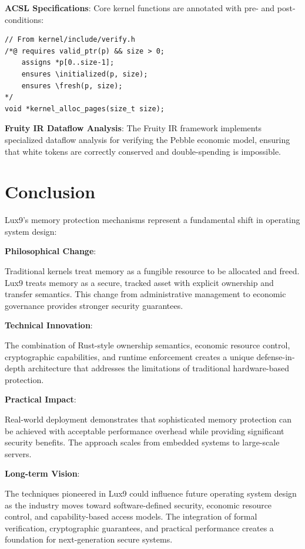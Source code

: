 \documentclass[11pt,letterpaper]{article}
\begin{document}
\textbf{ACSL Specifications}:
Core kernel functions are annotated with pre- and post-conditions:

\begin{lstlisting}
// From kernel/include/verify.h
/*@ requires valid_ptr(p) && size > 0;
    assigns *p[0..size-1];
    ensures \initialized(p, size);
    ensures \fresh(p, size);
*/
void *kernel_alloc_pages(size_t size);
\end{lstlisting}

\textbf{Fruity IR Dataflow Analysis}:
The Fruity IR framework implements specialized dataflow analysis for verifying the Pebble economic model, ensuring that white tokens are correctly conserved and double-spending is impossible.

\section{Conclusion}

Lux9's memory protection mechanisms represent a fundamental shift in operating system design:

\textbf{Philosophical Change}:

Traditional kernels treat memory as a fungible resource to be allocated and freed. Lux9 treats memory as a secure, tracked asset with explicit ownership and transfer semantics. This change from administrative management to economic governance provides stronger security guarantees.

\textbf{Technical Innovation}:

The combination of Rust-style ownership semantics, economic resource control, cryptographic capabilities, and runtime enforcement creates a unique defense-in-depth architecture that addresses the limitations of traditional hardware-based protection.

\textbf{Practical Impact}:

Real-world deployment demonstrates that sophisticated memory protection can be achieved with acceptable performance overhead while providing significant security benefits. The approach scales from embedded systems to large-scale servers.

\textbf{Long-term Vision}:

The techniques pioneered in Lux9 could influence future operating system design as the industry moves toward software-defined security, economic resource control, and capability-based access models. The integration of formal verification, cryptographic guarantees, and practical performance creates a foundation for next-generation secure systems.
\end{document}
